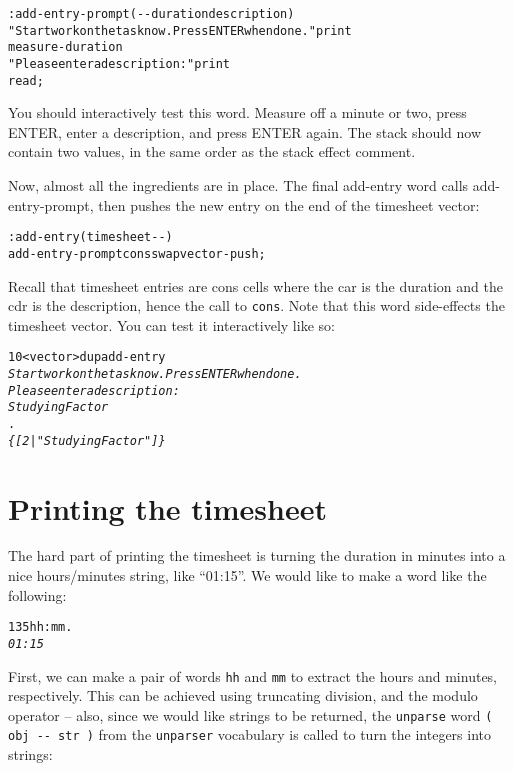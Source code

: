 \documentclass[english]{book}
\begin{document}
\begin{alltt}
: add-entry-prompt ( -{}- duration description )
    "Start work on the task now. Press ENTER when done." print
    measure-duration
    "Please enter a description:" print
    read ;
\end{alltt}

You should interactively test this word. Measure off a minute or two,
press ENTER, enter a description, and press ENTER again. The stack
should now contain two values, in the same order as the stack effect
comment.

Now, almost all the ingredients are in place. The final add-entry
word calls add-entry-prompt, then pushes the new entry on the end
of the timesheet vector:

\begin{alltt}
: add-entry ( timesheet -{}- )
    add-entry-prompt cons swap vector-push ;
\end{alltt}

Recall that timesheet entries are cons cells where the car is the
duration and the cdr is the description, hence the call to \texttt{cons}.
Note that this word side-effects the timesheet vector. You can test
it interactively like so:

\begin{alltt}
10 <vector> dup add-entry
\emph{Start work on the task now. Press ENTER when done.}
\emph{Please enter a description:}
\emph{Studying Factor}
.
\emph{\{ {[} 2 | "Studying Factor" {]} \}}
\end{alltt}

\section{Printing the timesheet}

The hard part of printing the timesheet is turning the duration in
minutes into a nice hours/minutes string, like {}``01:15''. We would
like to make a word like the following:

\begin{alltt}
135 hh:mm .
\emph{01:15}
\end{alltt}

First, we can make a pair of words \texttt{hh} and \texttt{mm} to extract the hours
and minutes, respectively. This can be achieved using truncating division,
and the modulo operator -- also, since we would like strings to be
returned, the \texttt{unparse} word \texttt{( obj -{}- str )} from
the \texttt{unparser} vocabulary is called to turn the integers into
strings:
\end{document}
